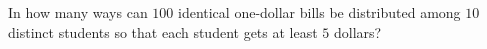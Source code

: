 In how many ways can $100$ identical one-dollar bills be distributed among $10$ distinct students so that each student gets at least $5$ dollars?
